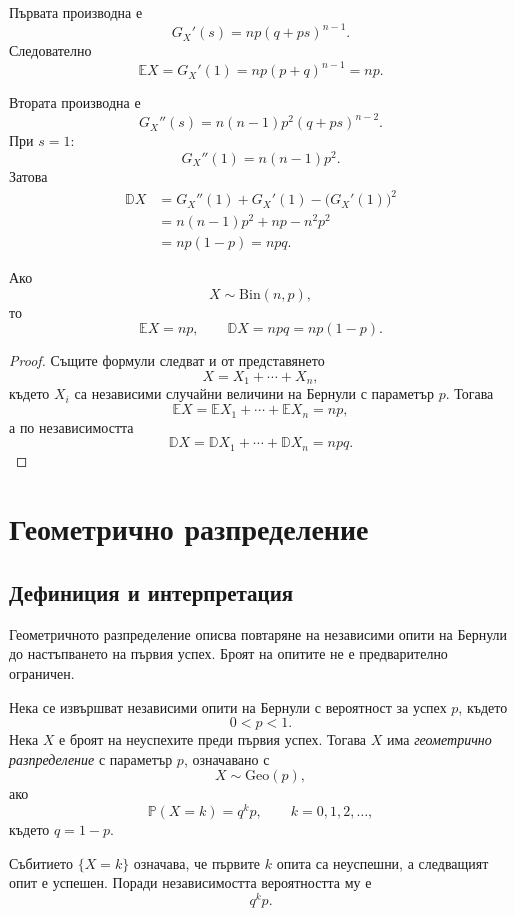 Първата производна е
\[
G_X'(s)=np(q+ps)^{n-1}.
\]
Следователно
\[
\mathbb{E}X=G_X'(1)
=np(p+q)^{n-1}=np.
\]

Втората производна е
\[
G_X''(s)=n(n-1)p^2(q+ps)^{n-2}.
\]
При $s=1$:
\[
G_X''(1)=n(n-1)p^2.
\]
Затова
\[
\begin{aligned}
\mathbb{D}X
&=G_X''(1)+G_X'(1)-\bigl(G_X'(1)\bigr)^2\\
&=n(n-1)p^2+np-n^2p^2\\
&=np(1-p)=npq.
\end{aligned}
\]

\begin{keythm}
Ако
\[
X\sim\mathrm{Bin}(n,p),
\]
то
\[
\mathbb{E}X=np,
\qquad
\mathbb{D}X=npq=np(1-p).
\]
\end{keythm}

\begin{proof}
Същите формули следват и от представянето
\[
X=X_1+\cdots+X_n,
\]
където $X_i$ са независими случайни величини на Бернули с параметър $p$. Тогава
\[
\mathbb{E}X
=
\mathbb{E}X_1+\cdots+\mathbb{E}X_n
=np,
\]
а по независимостта
\[
\mathbb{D}X
=
\mathbb{D}X_1+\cdots+\mathbb{D}X_n
=npq.
\]
\end{proof}

\section{Геометрично разпределение}\label{s:35.4}

\subsection{Дефиниция и интерпретация}\label{s:35.4.1}

Геометричното разпределение описва повтаряне на независими опити на Бернули до настъпването на първия успех. Броят на опитите не е предварително ограничен.

\begin{defn}
Нека се извършват независими опити на Бернули с вероятност за успех $p$, където
\[
0<p<1.
\]
Нека $X$ е броят на неуспехите преди първия успех. Тогава $X$ има \emph{геометрично разпределение} с параметър $p$, означавано с
\[
X\sim\mathrm{Geo}(p),
\]
ако
\[
\mathbb{P}(X=k)=q^kp,
\qquad k=0,1,2,\ldots,
\]
където $q=1-p$.
\end{defn}

Събитието $\{X=k\}$ означава, че първите $k$ опита са неуспешни, а следващият опит е успешен. Поради независимостта вероятността му е
\[
q^kp.
\]

